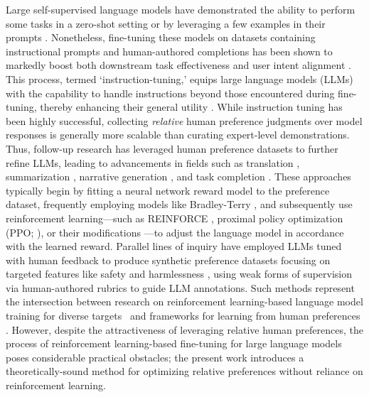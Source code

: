 Large self-supervised language models have demonstrated the ability to perform some tasks in a zero-shot setting \citep{radford2019language} or by leveraging a few examples in their prompts \citep{gpt3,megatron,chowdhery2022palm}. Nonetheless, fine-tuning these models on datasets containing instructional prompts and human-authored completions has been shown to markedly boost both downstream task effectiveness and user intent alignment \citep{mishra-etal-2022-cross,sanh2022multitask,chung2022scaling,thoppilan2022lamda}. This process, termed `instruction-tuning,' equips large language models (LLMs) with the capability to handle instructions beyond those encountered during fine-tuning, thereby enhancing their general utility \citep{chung2022scaling}. While instruction tuning has been highly successful, collecting \textit{relative} human preference judgments over model responses is generally more scalable than curating expert-level demonstrations. Thus, follow-up research has leveraged human preference datasets to further refine LLMs, leading to advancements in fields such as translation \citep{kreutzer-etal-2018-reliability}, summarization \citep{stiennon2022learning,ziegler2020finetuning}, narrative generation \citep{ziegler2020finetuning}, and task completion \citep{ouyang2022training,ramamurthy2023is}. These approaches typically begin by fitting a neural network reward model to the preference dataset, frequently employing models like Bradley-Terry \citep{bradley1952rankanalysis}, and subsequently use reinforcement learning—such as REINFORCE \citep{williams1992reinforce}, proximal policy optimization (PPO; \cite{schulman2017proximal}), or their modifications \citep{ramamurthy2023is}—to adjust the language model in accordance with the learned reward. Parallel lines of inquiry have employed LLMs tuned with human feedback to produce synthetic preference datasets focusing on targeted features like safety and harmlessness \citep{bai2022constitutional}, using weak forms of supervision via human-authored rubrics to guide LLM annotations. Such methods represent the intersection between research on reinforcement learning-based language model training for diverse targets~\citep{Ranzato2015SequenceLT,paulus2018a,wu2018learning} and frameworks for learning from human preferences \citep{christiano2017deep,kupcsik2018learning}. However, despite the attractiveness of leveraging relative human preferences, the process of reinforcement learning-based fine-tuning for large language models poses considerable practical obstacles; the present work introduces a theoretically-sound method for optimizing relative preferences without reliance on reinforcement learning.

